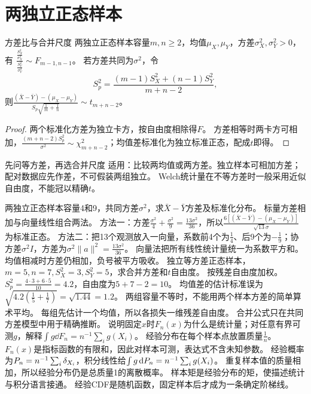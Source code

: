 \section{两独立正态样本}\label{sec:64}
\begin{theorem}{方差比与合并尺度}
两独立正态样本容量$m,n\ge2$，均值$\mu_X,\mu_Y$，方差$\sigma_X^2,\sigma_Y^2>0$，有
$\frac{\frac{S_X^2}{\sigma_X^2}}{\frac{S_Y^2}{\sigma_Y^2}}\sim F_{m-1,n-1}$。
若方差共同为$\sigma^2$，令
\[S_p^2=\dfrac{(m-1)S_X^2+(n-1)S_Y^2}{m+n-2},\]
则$\frac{(\bar X-\bar Y)-(\mu_X-\mu_Y)}{S_p\sqrt{\frac{1}{m}+\frac{1}{n}}}\sim t_{m+n-2}$。
\end{theorem}
\begin{proof}
两个标准化方差为独立卡方，按自由度相除得$F$。
方差相等时两卡方可相加，$\frac{(m+n-2)S_p^2}{\sigma^2}\sim\chi_{m+n-2}^2$；均值差标准化为独立标准正态，配成$t$即得。
\end{proof}
\begin{method}{先问等方差，再选合并尺度}
适用：比较两均值或两方差。独立样本可相加方差；配对数据应先作差，不可假装两组独立。
Welch统计量在不等方差时一般采用近似自由度，不能冠以精确$t$。
\end{method}
{两独立正态样本容量4和9，共同方差$\sigma^2$，求$\bar X-\bar Y$方差及标准化分布。}
{标量方差相加与向量线性组合两法。}
{方法一：方差$\frac{\sigma^2}{4}+\frac{\sigma^2}{9}=\frac{13\sigma^2}{36}$，所以$\frac{6[(\bar X-\bar Y)-(\mu_X-\mu_Y)]}{\sqrt{13}\sigma}$为标准正态。
方法二：把13个观测放入一向量，系数前4个为$\frac{1}{4}$、后9个为$-\frac{1}{9}$；协方差$\sigma^2I$，方差为$\sigma^2\|a\|^2=\frac{13\sigma^2}{36}$。}
{向量法把所有线性统计量统一为系数平方和。}
{均值相减时方差仍相加，负号被平方吸收。}
{独立等方差正态样本，$m=5,n=7,S_X^2=3,S_Y^2=5$，求合并方差和$t$自由度。}
{按残差自由度加权。}
{$S_p^2=\frac{4\cdot3+6\cdot5}{10}=4.2$，自由度为$5+7-2=10$。
均值差的估计标准误为$\sqrt{4.2(\frac{1}{5}+\frac{1}{7})}=\sqrt{1.44}=1.2$。
两组容量不等时，不能用两个样本方差的简单算术平均。}
{每组先估计一个均值，所以各损失一维残差自由度。}
{合并公式只在共同方差模型中用于精确推断。}
{说明固定$x$时$F_n(x)$为什么是统计量；对任意有界可测$g$，解释$\int g\dd F_n=n^{-1}\sum_i g(X_i)$。}
{经验分布在每个样本点放置质量$\frac{1}{n}$。}
{$F_n(x)$是指标函数的有限和，因此对样本可测，表达式不含未知参数。
经验概率为$P_n=n^{-1}\sum_i\delta_{X_i}$，积分线性给$\int g\,\mathrm dP_n=n^{-1}\sum_i g(X_i)$。
重复样本值的质量相加，所以经验分布仍是总质量1的离散概率。}
{样本矩是经验分布的矩，使描述统计与积分语言接通。}
{经验CDF是随机函数，固定样本后才成为一条确定阶梯线。}

